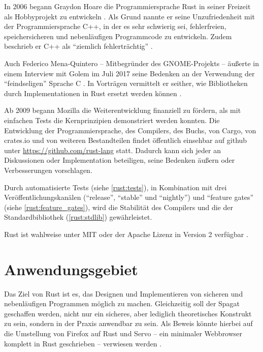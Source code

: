 In 2006 begann Graydon Hoare die Programmiersprache Rust in seiner Freizeit als Hobbyprojekt zu entwickeln \cite{rust:faq}.
Als Grund nannte er seine Unzufriedenheit mit der Programmiersprache C++, in der es sehr schwierig sei, fehlerfreien, speichersicheren und nebenläufigen Programmcode zu entwickeln.
Zudem beschrieb er C++ als \enquote{ziemlich fehlerträchtig} \cite{rust:heise_interview_graydon}.

Auch Federico Mena-Quintero -- Mitbegründer des GNOME-Projekts \cite{rust:gnome:federico}  --
äußerte in einem Interview mit Golem im Juli 2017 seine Bedenken an der Verwendung der \enquote{feindseligen} Sprache C \cite{rust:c_is_hostile_golem}.
In Vorträgen vermittelt er seither, wie Bibliotheken durch Implementationen in Rust ersetzt werden können \cite{rust:c_is_hostile_mena}.

Ab 2009 begann Mozilla die Weiterentwicklung finanziell zu fördern, als mit einfachen Tests die Kernprinzipien demonstriert werden konnten.
Die Entwicklung der Programmiersprache, des Compilers, des Buchs, von Cargo, von crates.io und von weiteren Bestandteilen findet öffentlich einsehbar auf \gls{github}  unter \url{https://github.com/rust-lang} statt.
Dadurch kann sich jeder an Diskussionen oder Implementation beteiligen, seine Bedenken äußern oder Verbesserungen vorschlagen.

Durch automatisierte Tests (siehe \autoref{rust:tests}), in Kombination mit drei Veröffentlichungskanälen (\enquote{release}, \enquote{stable} und \enquote{nightly}) und \enquote{feature gates} (siehe \autoref{rust:feature_gates}), wird die Stabilität des Compilers und die der Standardbibliothek (\autoref{rust:stdlib}) gewährleistet.

Rust ist wahlweise unter MIT oder der Apache Lizenz in Version 2 verfügbar \cite{rust:copyright}.

\section{Anwendungsgebiet}

Das Ziel von Rust ist es, das Designen und Implementieren von sicheren und nebenläufigen Programmen möglich zu machen.
Gleichzeitig soll der Spagat geschaffen werden, nicht nur ein sicheres, aber lediglich theoretisches Konstrukt zu sein, sondern  in der Praxis anwendbar zu sein.
Als Beweis könnte hierbei auf die Umstellung von Firefox auf Rust und Servo -- ein minimaler Webbrowser komplett in Rust geschrieben -- verwiesen werden \cite{rust:faq}.


